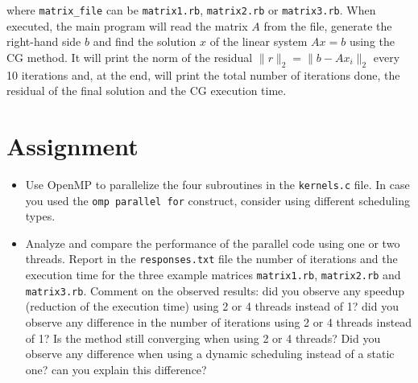 \documentclass{article}
\begin{document}
where \texttt{matrix\_file} can be \texttt{matrix1.rb},
\texttt{matrix2.rb} or \texttt{matrix3.rb}. When executed, the main
program will read the matrix $A$ from the file, generate the
right-hand side $b$ and find the solution $x$ of the linear system
$Ax=b$ using the CG method. It will print the norm of the residual
$\|r\|_2 = \|b-Ax_i\|_2$ every 10 iterations and, at the end, will
print the total number of iterations done, the residual of the final
solution and the CG execution time.



\section{Assignment}
\begin{itemize}
\item {\huge \Keyboard} Use OpenMP to parallelize the four subroutines in the
\texttt{kernels.c} file. In case you used the \texttt{omp parallel
  for} construct, consider using different scheduling types.
\item \smallpencil Analyze and compare the performance of the parallel
  code using one or two threads. Report in the \texttt{responses.txt}
  file the number of iterations and the execution time for the three
  example matrices \texttt{matrix1.rb}, \texttt{matrix2.rb} and
  \texttt{matrix3.rb}. Comment on the observed results: did you
  observe any speedup (reduction of the execution time) using 2 or 4
  threads instead of 1? did you observe any difference in the number
  of iterations using 2 or 4 threads instead of 1?  Is the method
  still converging when using 2 or 4 threads? Did you observe any
  difference when using a dynamic scheduling instead of a static one?
  can you explain this difference?
\end{itemize}
\end{document}
